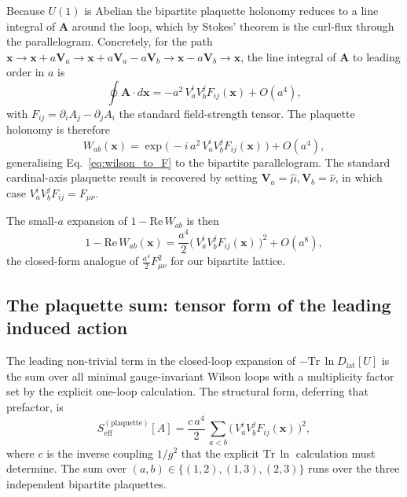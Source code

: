 Because $U(1)$ is Abelian the bipartite plaquette holonomy reduces to
a line integral of $\mathbf{A}$ around the loop, which by Stokes'
theorem is the curl-flux through the parallelogram.  Concretely, for
the path $\mathbf{x} \to \mathbf{x} + a\mathbf{V}_a \to
\mathbf{x} + a\mathbf{V}_a - a\mathbf{V}_b \to \mathbf{x} - a\mathbf{V}_b
\to \mathbf{x}$, the line integral of $\mathbf{A}$ to leading order in
$a$ is
\begin{equation}
    \oint \mathbf{A}\cdot d\mathbf{x}
        = -a^2\,V_a^i V_b^j F_{ij}(\mathbf{x}) + O(a^4),
    \label{eq:stokes_line}
\end{equation}
with $F_{ij} = \partial_i A_j - \partial_j A_i$ the standard
field-strength tensor.  The plaquette holonomy is therefore
\begin{equation}
    W_{ab}(\mathbf{x})
        = \exp\!\bigl(\,-i\,a^2\,V_a^i V_b^j F_{ij}(\mathbf{x})\,\bigr)
        + O(a^4),
    \label{eq:bipartite_holonomy}
\end{equation}
generalising Eq.~\eqref{eq:wilson_to_F} to the bipartite parallelogram.
The standard cardinal-axis plaquette result is recovered by setting
$\mathbf{V}_a = \hat{\mu}, \mathbf{V}_b = \hat{\nu}$, in which case
$V_a^i V_b^j F_{ij} = F_{\mu\nu}$.

The small-$a$ expansion of $1 - \mathrm{Re}\,W_{ab}$ is then
\begin{equation}
    1 - \mathrm{Re}\,W_{ab}(\mathbf{x})
        = \frac{a^4}{2}\bigl(\,V_a^i V_b^j F_{ij}(\mathbf{x})\,\bigr)^2
        + O(a^8),
    \label{eq:plaquette_expand}
\end{equation}
the closed-form analogue of $\frac{a^4}{2} F_{\mu\nu}^2$ for our
bipartite lattice.

\subsection{The plaquette sum: tensor form of the leading induced action}
\label{subsec:induced_plaquette_sum}

The leading non-trivial term in the closed-loop expansion of
$-\mathrm{Tr}\,\ln D_\text{lat}[U]$ is the sum over all minimal
gauge-invariant Wilson loops with a multiplicity factor set by the
explicit one-loop calculation.  The structural form, deferring that
prefactor, is
\begin{equation}
    S_\text{eff}^{(\text{plaquette})}[A]
        = \frac{c\,a^4}{2}\,
        \sum_{a < b}\bigl(\,V_a^i V_b^j F_{ij}(\mathbf{x})\,\bigr)^2,
    \label{eq:induced_plaquette_sum}
\end{equation}
where $c$ is the inverse coupling $1/g^2$ that the explicit
$\mathrm{Tr}\,\ln$ calculation must determine.  The sum over
$(a, b) \in \{(1,2), (1,3), (2,3)\}$ runs over the three
independent bipartite plaquettes.

